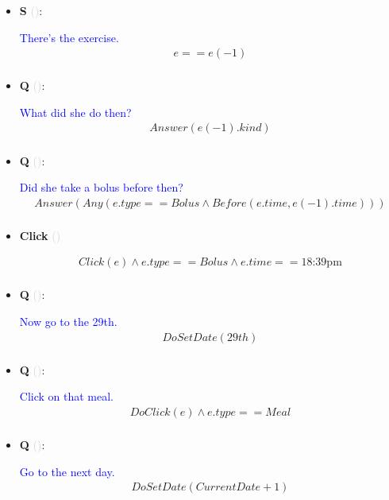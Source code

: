 \documentclass[11pt]{article}
\newcounter{CQ}
\newcounter{CS}
\newcounter{CClick}
\newcommand{\key}[1]{\textcolor{lightgray}{#1}}
\begin{document}
\begin{itemize}
	
	\item
	\textbf{S\theCS} \key{()}: \addtocounter{CS}{1}
	\textcolor{blue}{ There's the exercise. }
	\begin{multline*}
	e == e(-1) \\
	\end{multline*}
	
	
	\item
	\textbf{Q\theCQ} \key{()}: \addtocounter{CQ}{1}
	\textcolor{blue}{ What did she do then? }
	\begin{multline*}
	Answer(e(-1).kind) \\
	\end{multline*}
	
	 
	
	\item
	\textbf{Q\theCQ} \key{()}: \addtocounter{CQ}{1}
	\textcolor{blue}{ Did she take a bolus before then? }
	\begin{multline*}
	Answer(Any(e.type==Bolus \wedge Before(e.time, e(-1).time))) \\
	\end{multline*}
	
	
	\item
	\textbf{Click\theCClick} \key{()} \addtocounter{CClick}{1}
	\begin{multline*}
	Click(e) \wedge e.type == Bolus \wedge e.time == \mbox{18:39pm}  \\
	\end{multline*}
	
	
	\item
	\textbf{Q\theCQ} \key{()}: \addtocounter{CQ}{1}
	\textcolor{blue}{ Now go to the 29th. }
	\begin{multline*}
	DoSetDate(29th) \\
	\end{multline*}
	
	
	\item
	\textbf{Q\theCQ} \key{()}: \addtocounter{CQ}{1}
	\textcolor{blue}{ Click on that meal. }
	\begin{multline*}
	DoClick(e) \wedge e.type == Meal \\
	\end{multline*}


	\item
	\textbf{Q\theCQ} \key{()}: \addtocounter{CQ}{1}
	\textcolor{blue}{ Go to the next day. }
	\begin{multline*}
	DoSetDate(CurrentDate + 1) \\
	\end{multline*}
	

\end{itemize}
\end{document}
